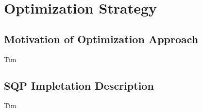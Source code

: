 \section{Optimization Strategy}

\subsection{Motivation of Optimization Approach}
Tim
\subsection{SQP Impletation Description}
Tim


